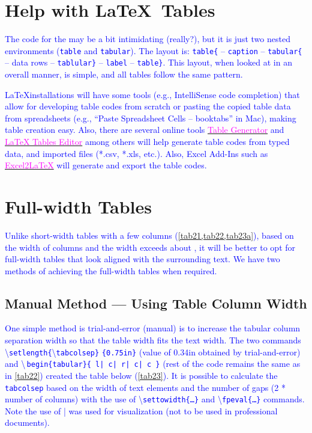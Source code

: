 \documentclass[phd,showframe]{ndsu-thesis-2022}
\newcommand\italk[1]{\textcolor{blue}{#1}}  %
\newcommand\cmd[1]{\textbackslash\texttt{#1}}  %
\newcommand\vb[1]{\textcolor{blue}{\texttt{#1}}}%
\newcommand\vbc[1]{\textcolor{blue}{\textbackslash\,\texttt{#1}}}%
\begin{document}
\section{Help with \LaTeX\ Tables}
\italk{The code for the  may be a bit intimidating (really?), but it is just two nested environments (\vb{table} and \vb{tabular}). The layout is: \vb{table\{} -- \vb{caption} -- \vb{tabular\{} -- data rows -- \vb{tablular\}} -- \vb{label} -- \vb{table\}}. This layout, when looked at in an overall manner, is simple, and all tables follow the same pattern.}  

\italk{\LaTeX installations will have some tools (e.g., IntelliSense code completion) that allow for developing table codes from scratch or pasting the copied table data from spreadsheets (e.g., ``Paste Spreadsheet Cells -- booktabs'' in Mac), making table creation easy. Also, there are several online tools \href{https://www.tablesgenerator.com}{\textcolor{magenta}{Table Generator}} and \href{https://www.latex-tables.com}{\textcolor{magenta}{LaTeX Tables Editor}} among others will help generate table codes from typed data, and imported files (*.csv, *.xls, etc.). Also, Excel Add-Ins such as \href{https://ctan.org/tex-archive/support/excel2latex?lang=en}{\textcolor{magenta}{Excel2\LaTeX}} will generate and export the table codes. 
}

\section{Full-width Tables}
\italk{Unlike short-width tables with a few columns (\cref{tab21,tab22,tab23a}), based on the width of columns and the width exceeds about \pr{60}, it will be better to opt for full-width tables that look aligned with the surrounding text. We have two methods of achieving the full-width tables when required.}

\subsection{Manual Method --- Using Table Column Width}
\italk{One simple method is trial-and-error (manual) is to increase the tabular column separation width so that the table width fits the text width. The two commands \cmd{setlength\{}\cmd{tabcolsep\}} \vb{\{0.75in\}} (value of 0.34in obtained by trial-and-error) and \vbc{begin\{tabular\}\{ l|   c|   r|   c|   c \}} (rest of the code remains the same as in \cref{tab22}) created the table below (\cref{tab23}). It is possible to calculate the \vb{tabcolsep} based on the width of text elements and the number of gaps (2 * number of columns) with the use of \cmd{settowidth\{\ldots\}} and \cmd{fpeval\{\ldots\}} commands. Note the use of | was used for visualization (not to be used in professional documents).} 
\end{document}
